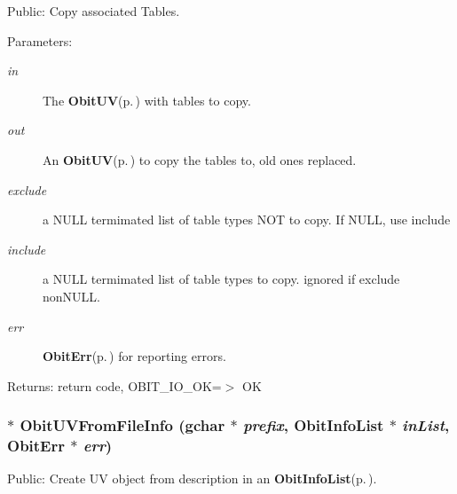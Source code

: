 Public: Copy associated Tables. 

\begin{Desc}
\item[Parameters:]
\begin{description}
\item[{\em in}]The {\bf Obit\-UV}{\rm (p.\,\pageref{structObitUV})} with tables to copy. \item[{\em out}]An {\bf Obit\-UV}{\rm (p.\,\pageref{structObitUV})} to copy the tables to, old ones replaced. \item[{\em exclude}]a NULL termimated list of table types NOT to copy. If NULL, use include \item[{\em include}]a NULL termimated list of table types to copy. ignored if exclude non\-NULL. \item[{\em err}]{\bf Obit\-Err}{\rm (p.\,\pageref{structObitErr})} for reporting errors. \end{description}
\end{Desc}
\begin{Desc}
\item[Returns:]return code, OBIT\_\-IO\_\-OK=$>$ OK \end{Desc}
\subsubsection{$\ast$ Obit\-UVFrom\-File\-Info (gchar $\ast$ {\em prefix}, {\bf Obit\-Info\-List} $\ast$ {\em in\-List}, {\bf Obit\-Err} $\ast$ {\em err})}\label{ObitUV_8c_a11}


Public: Create UV object from description in an {\bf Obit\-Info\-List}{\rm (p.\,\pageref{structObitInfoList})}. 

